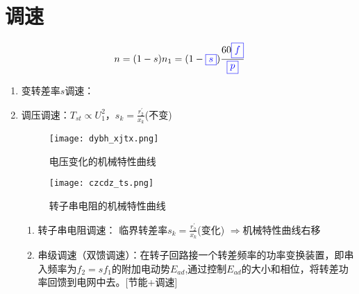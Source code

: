 \documentclass[blue]{elegantnote}
\begin{document}
\section{调速}
$$n=(1-s)n_1=(1-{\color{blue}\boxed{s}})\frac{60{\color{blue}\boxed{f}}}{{\color{blue}\boxed{p}}}$$
\begin{enumerate}
	\item 变转差率$s$调速：
	
	\item 调压调速：{\color{blue}$T_{st}\propto U_{1}^{2}$，$s_k=\frac{r_2^{'}}{x_k}$(不变)}
		\begin{figure}[!hbtp]
			\centering
			\begin{minipage}[t]{0.48\textwidth}
				\centering
				\texttt{[image: dybh\_xjtx.png]}
				\caption{电压变化的机械特性曲线\label{figur:dybh_xjtx}}
			\end{minipage}
			\begin{minipage}[t]{0.48\textwidth}
				\centering
				\texttt{[image: czcdz\_ts.png]}
				\caption{转子串电阻的机械特性曲线\label{figur:czcdz_ts}}
			\end{minipage}
		\end{figure}
		\begin{enumerate}
			\item 转子串电阻调速： 临界转差率$s_k=\frac{r_2^{'}}{x_k}$(变化) $\Rightarrow$机械特性曲线{\color{blue}右移}
			\item 串级调速（双馈调速）：在转子回路接一个转差频率的功率变换装置，即{\color{blue}串入频率为$f_2=sf_1$的附加电动势$E_{ad}$},通过{\color{blue}控制$E_{ad}$的大小和相位}，将转差功率回馈到电网中去。[节能+调速]
			

\end{enumerate}
\end{enumerate}
\end{document}
